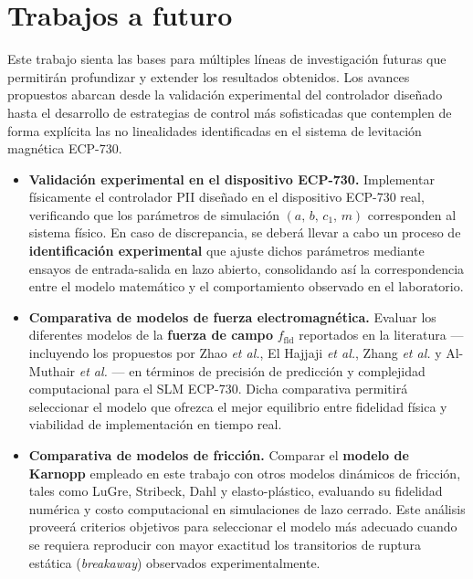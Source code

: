 \section{Trabajos a futuro}

Este trabajo sienta las bases para múltiples líneas de investigación futuras que permitirán
profundizar y extender los resultados obtenidos. Los avances propuestos abarcan desde la
validación experimental del controlador diseñado hasta el desarrollo de estrategias de control
más sofisticadas que contemplen de forma explícita las no linealidades identificadas en el
sistema de levitación magnética ECP-730.

\begin{itemize}

    \item \textbf{Validación experimental en el dispositivo ECP-730.}
    Implementar físicamente el controlador PII diseñado en el dispositivo ECP-730 real,
    verificando que los parámetros de simulación $(a,\, b,\, c_1,\, m)$ corresponden al
    sistema físico. En caso de discrepancia, se deberá llevar a cabo un proceso de
    \textbf{identificación experimental} que ajuste dichos parámetros mediante ensayos de
    entrada-salida en lazo abierto, consolidando así la correspondencia entre el modelo
    matemático y el comportamiento observado en el laboratorio.

    \item \textbf{Comparativa de modelos de fuerza electromagnética.}
    Evaluar los diferentes modelos de la \textbf{fuerza de campo} $f_{\mathrm{fld}}$
    reportados en la literatura --- incluyendo los propuestos por Zhao \textit{et al.},
    El Hajjaji \textit{et al.}, Zhang \textit{et al.} y Al-Muthair \textit{et al.} ---
    en términos de precisión de predicción y complejidad computacional para el SLM ECP-730.
    Dicha comparativa permitirá seleccionar el modelo que ofrezca el mejor equilibrio entre
    fidelidad física y viabilidad de implementación en tiempo real.

    \item \textbf{Comparativa de modelos de fricción.}
    Comparar el \textbf{modelo de Karnopp} empleado en este trabajo con otros modelos
    dinámicos de fricción, tales como LuGre, Stribeck, Dahl y elasto-plástico, evaluando
    su fidelidad numérica y costo computacional en simulaciones de lazo cerrado. Este
    análisis proveerá criterios objetivos para seleccionar el modelo más adecuado cuando
    se requiera reproducir con mayor exactitud los transitorios de ruptura estática
    (\textit{breakaway}) observados experimentalmente.


\end{itemize}
